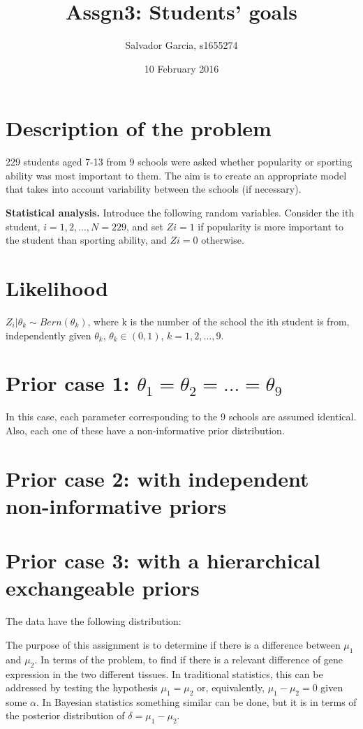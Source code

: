 \documentclass{article}
\author{Salvador Garcia, s1655274}
\date{10 February 2016}
\title{Assgn3: Students' goals}
\begin{document}
\maketitle
\section{Description of the problem} 

229 students aged 7-13 from 9 schools were asked whether popularity or sporting ability was
most important to them. The aim is to create an appropriate model that takes into account
variability between the schools (if necessary).

\textbf{Statistical analysis.}
Introduce the following random variables. Consider the ith student, $i = 1, 2, ... ,N = 229$, and set $Zi = 1$ if popularity is more important to the student than sporting ability, and $Zi = 0$
otherwise.
\section{Likelihood}
$Z_i | \theta_k \sim Bern(\theta_k)$, where k is the number of the school the ith student is from, independently given $\theta_k$, $\theta_k \in (0, 1)$, $k = 1, 2, ... , 9$.

\section{Prior case 1: $\theta_1 = \theta_2 = ... = \theta_9$}
In this case, each parameter corresponding to the 9 schools are assumed identical. Also, each one of these have a non-informative prior distribution.




\section{Prior case 2: with independent non-informative priors}
\section{Prior case 3: with a hierarchical exchangeable priors}
The data have the following distribution:




The purpose of this assignment is to determine if there is a difference between $\mu_1$ and $\mu_2$. In terms of the problem, to find if there is a relevant difference of gene expression in the two different tissues. In traditional statistics, this can be addressed by testing the hypothesis $\mu_1 = \mu_2$ or, equivalently, $\mu_1- \mu_2 = 0$ given some $\alpha$. In Bayesian statistics something similar can be done, but it is in terms of the posterior distribution of $\delta = \mu_1 - \mu_2$. 
\end{document}
